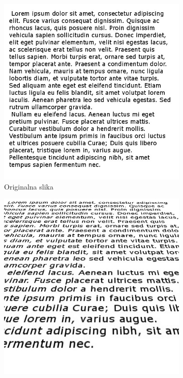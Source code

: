 \begin{figure}[ht]
\centering
\begin{subfigure}{0.45\textwidth}
\begin{minipage}{0.9\textwidth}
	\centering
	\includegraphics[width=\textwidth]{figures/lipsum.jpg}
	\caption{Originalna slika}
	\label{fig:lipsum_orig}
\end{minipage}
\end{subfigure}%
\begin{subfigure}{0.45\textwidth}
\begin{minipage}{0.9\textwidth}
	\centering
	\includegraphics[width=\textwidth]{figures/lipsumPerspective.jpg}

\end{minipage}
\end{subfigure}
\end{figure}
